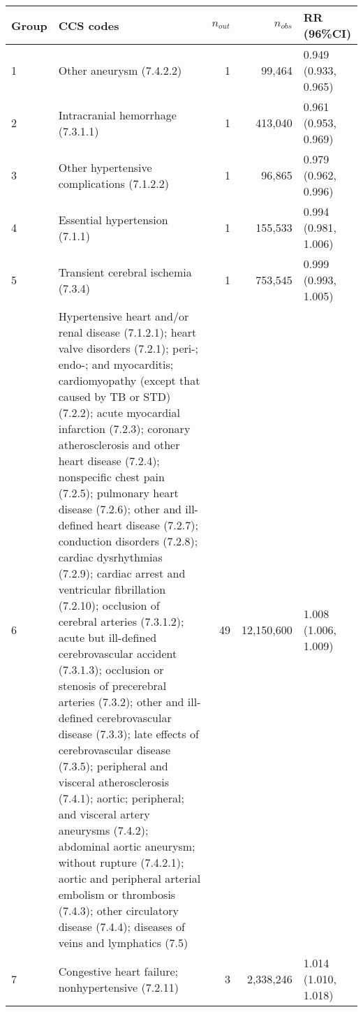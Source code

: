 \begin{tabular}{lp{6.5cm}rrp{2.2cm}}
  \hline
Group & CCS codes & $n_{out}$ & $n_{obs}$ & RR (96\%CI) \\ 
  \hline
   1 & Other aneurysm (7.4.2.2) &    1 & 99,464 & 0.949 (0.933, 0.965) \\ 
     2 & Intracranial hemorrhage (7.3.1.1) &    1 & 413,040 & 0.961 (0.953, 0.969) \\ 
     3 & Other hypertensive complications (7.1.2.2) &    1 & 96,865 & 0.979 (0.962, 0.996) \\ 
     4 & Essential hypertension (7.1.1) &    1 & 155,533 & 0.994 (0.981, 1.006) \\ 
     5 & Transient cerebral ischemia (7.3.4) &    1 & 753,545 & 0.999 (0.993, 1.005) \\ 
     6 & Hypertensive heart and/or renal disease (7.1.2.1); heart valve disorders (7.2.1); peri-; endo-; and myocarditis; cardiomyopathy (except that caused by TB or STD) (7.2.2); acute myocardial infarction (7.2.3); coronary atherosclerosis and other heart disease (7.2.4); nonspecific chest pain (7.2.5); pulmonary heart disease (7.2.6); other and ill-defined heart disease (7.2.7); conduction disorders (7.2.8); cardiac dysrhythmias (7.2.9); cardiac arrest and ventricular fibrillation (7.2.10); occlusion of cerebral arteries (7.3.1.2); acute but ill-defined cerebrovascular accident (7.3.1.3); occlusion or stenosis of precerebral arteries (7.3.2); other and ill-defined cerebrovascular disease (7.3.3); late effects of cerebrovascular disease (7.3.5); peripheral and visceral atherosclerosis (7.4.1); aortic; peripheral; and visceral artery aneurysms (7.4.2); abdominal aortic aneurysm; without rupture (7.4.2.1); aortic and peripheral arterial embolism or thrombosis (7.4.3); other circulatory disease (7.4.4); diseases of veins and lymphatics (7.5) &   49 & 12,150,600 & 1.008 (1.006, 1.009) \\ 
     7 & Congestive heart failure; nonhypertensive (7.2.11) &    3 & 2,338,246 & 1.014 (1.010, 1.018) \\ 
   \hline
\end{tabular}

